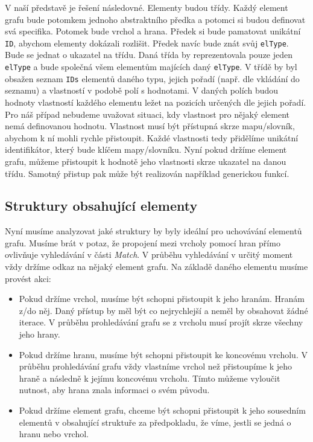 V naší představě je řešení následovné.
Elementy budou třídy.
Každý element grafu bude potomkem jednoho abstraktního předka a potomci si budou definovat svá specifika.
Potomek bude vrchol a hrana.
Předek si bude pamatovat unikátní \verb+ID+, abychom elementy dokázali rozlišit. 
Předek navíc bude znát svůj \verb+elType+. 
Bude se jednat o ukazatel na třídu.
Daná třída by reprezentovala pouze jeden \verb+elType+ a bude společná všem elementům majících daný \verb+elType+.
V třídě by byl obsažen seznam \verb+IDs+ elementů daného typu, jejich pořadí (např. dle vkládání do seznamu) a vlastností v podobě polí s hodnotami.
V daných polích budou hodnoty vlastností každého elementu ležet na pozicích určených dle jejich pořadí.
Pro náš případ nebudeme uvažovat situaci, kdy vlastnost pro nějaký element nemá definovanou hodnotu.
Vlastnost musí být přístupná skrze mapu/slovník, abychom k ní mohli rychle přistoupit.
Každé vlastnosti tedy přidělíme unikátní identifikátor, který bude klíčem mapy/slovníku.
Nyní pokud držíme element grafu, můžeme přistoupit k hodnotě jeho vlastnosti skrze ukazatel na danou třídu.
Samotný přistup pak může být realizován například generickou funkcí. 

\subsection{Struktury obsahující elementy}

Nyní musíme analyzovat jaké struktury by byly ideální pro uchovávání elementů grafu.
Musíme brát v potaz, že propojení mezi vrcholy pomocí hran přímo ovlivňuje vyhledávání v části \textit{Match}.
V průběhu vyhledávání v určitý moment vždy držíme odkaz na nějaký element grafu.
Na základě daného elementu musíme provést akci:

\begin{itemize}

\item Pokud držíme vrchol, musíme být schopni přistoupit k jeho hranám.
Hranám z/do něj. Daný přístup by měl být co nejrychlejší a neměl by obsahovat žádné iterace. 
V průběhu prohledávání grafu se z vrcholu musí projít skrze všechny jeho hrany. 

\item Pokud držíme hranu, musíme být schopni přistoupit ke koncovému vrcholu. 
V průběhu prohledávání grafu vždy vlastníme vrchol než přistoupíme k jeho hraně a následně k jejímu koncovému vrcholu. 
Tímto můžeme vyloučit nutnost, aby hrana znala informaci o svém původu.

\item Pokud držíme element grafu, chceme být schopni přistoupit k jeho sousedním elementů v obsahující struktuře za předpokladu, že víme, jestli se jedná o hranu nebo vrchol. 

\end{itemize}

